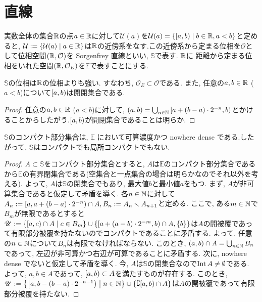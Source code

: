\documentclass[uplatex, dvipdfmx, a4paper, 12pt, class=jsbook, crop=false]{standalone}
\begin{document}
\section{\Sorgenfrey 直線}
\label{example:Sorgenfrey-line}

\newcommand{\bbS}{\mathbb{S}}
\newcommand{\locref}[1]{\ref{LocalLabel-\thepart-\thechapter-\thesection:#1}}
\newcommand{\loclabel}[1]{\label{LocalLabel-\thepart-\thechapter-\thesection:#1}}

実数全体の集合$ \mathbb{R} $の点$a \in \mathbb{R}$に対して$\mathcal{U}(a)$を$\mathcal{U}(a) = \setcomp{[a,b)}{b \in \R, a < b}$と定めると, $\mathcal{U} \defeq \setcomp{\mathcal{U}(a)}{a \in \R}$は$ \mathbb{R} $の近傍系をなす.この近傍系から定まる位相を$ \mathcal{O} $として位相空間$ (\mathbb{R}, \mathcal{O}) $を Sorgenfrey 直線といい, $ \bbS $で表す. $ \mathbb{R} $に \Euclid 距離から定まる位相をいれた空間$ (\mathbb{R}, \mathcal{O}_E)$を$ \mathbb{E} $で表すことにする.

\begin{property}
	\loclabel{property:a}
	$ \bbS $の位相は$ \mathbb{R} $の位相よりも強い. すなわち, $\mathcal{O}_E \subset \mathcal{O}$である. また, 任意の$ a, b \in \mathbb{R} $ ($a < b$)について$ \left[ a , b \right) $は開閉集合である.
\end{property}

\begin{proof}
	任意の$ a, b \in \mathbb{R} $ ($a < b$)に対して, $ \left( a , b \right) = \bigcup_{n \in \mathbb{N}} \left[ a+(b-a) \cdot 2^{-n} , b \right)$とかけることからしたがう.$ \left[ a , b \right) $が開閉集合であることは明らか.
\end{proof}

\begin{property}
	$ \bbS $のコンパクト部分集合は, $ \mathbb{E} $ において可算濃度かつ nowhere dense である.したがって, $ \bbS $はコンパクトでも局所コンパクトでもない.
\end{property}

\begin{proof}
	$ A \subset  \bbS $をコンパクト部分集合とすると, $ A $は$ \mathbb{E} $のコンパクト部分集合であるから$ \mathbb{E} $の有界閉集合である(空集合と一点集合の場合は明らかなのでそれ以外を考える). よって, $ A $は$ \bbS $の閉集合でもあり, 最大値$ b $と最小値$ a $をもつ. まず, $ A $が非可算集合であると仮定して矛盾を導く. 各$ n \in \mathbb{N} $に対して$ A_n \mathrel{:=} \left[ a , a+(b-a)\cdot2^{-n} \right) \cap A, B_n \mathrel{:=} A_n \smallsetminus A_{n+1} $と定める. ここで, ある$ m \in \mathbb{N} $で$ B_m $が無限であるとすると$ \mathscr{U} \defeq \setcomp{\intco{a}{c} \cap A}{c \in B_m} \cup \{\intco{a+(a-b)\cdot2^{-m}}{b}\cap A, \{b\}\}$は$ A $の開被覆であって有限部分被覆を持たないのでコンパクトであることに矛盾する. よって, 任意の$ n \in \mathbb{N} $について$ B_n $は有限でなければならない. このとき, $ \left( a , b \right) \cap A = \bigcup_{n \in \mathbb{N}}B_n $であって, 左辺が非可算かつ右辺が可算であることに矛盾する. 次に, nowhere dense でないと仮定して矛盾を導く. 今, $ A $は$ \bbS $の閉集合なので$ \mathop{\mathrm{Int}}\nolimits{A} \neq \emptyset $である. よって, $ a, b \in A $であって, $ \left[ a , b \right) \subset A $を満たすものが存在する. このとき, $ \mathscr{U} \defeq \setcomp{\intco{a}{b-(b-a)\cdot2^{-n-1}}}{n \in \N} \cup \{\complement{\intco{a}{b}} \cap A\}$は$ A $の開被覆であって有限部分被覆を持たない.
\end{proof}
\end{document}
